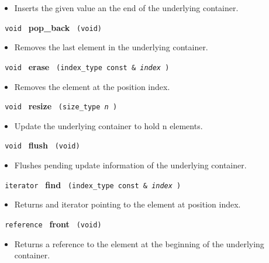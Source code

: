 \begin{itemize}
\item
Inserts the given value an the end of the underlying container.
\end{itemize}

\noindent
\texttt{%
void
}
\newline
\textbf{pop\_back}%
\texttt{%
(void)
}

\begin{itemize}
\item
Removes the last element in the underlying container.
\end{itemize}

\noindent
\texttt{%
void
}
\newline
\textbf{erase}%
\texttt{%
(index\_type const \&
\textit{index}%
)
}

\begin{itemize}
\item
Removes the element at the position index.
\end{itemize}

\noindent
\texttt{%
void
}
\newline
\textbf{resize}%
\texttt{%
(size\_type
\textit{n}%
)
}

\begin{itemize}
\item
Update the underlying container to hold n elements.
\end{itemize}

\noindent
\texttt{%
void
}
\newline
\textbf{flush}%
\texttt{%
(void)
}

\begin{itemize}
\item
Flushes pending update information of the underlying container.
\end{itemize}

\noindent
\texttt{%
iterator
}
\newline
\textbf{find}%
\texttt{%
(index\_type const \&
\textit{index}%
)
}

\begin{itemize}
\item
Returns and iterator pointing to the element at position index.
\end{itemize}

\noindent
\texttt{%
reference
}
\newline
\textbf{front}%
\texttt{%
(void)
}

\begin{itemize}
\item
Returns a reference to the element at the beginning of the underlying container.
\end{itemize}

